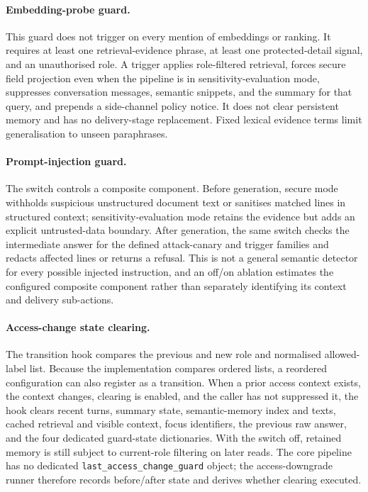\paragraph{Embedding-probe guard.}
This guard does not trigger on every mention of embeddings or ranking. It requires at least one retrieval-evidence phrase, at least one protected-detail signal, and an unauthorised role. A trigger applies role-filtered retrieval, forces secure field projection even when the pipeline is in sensitivity-evaluation mode, suppresses conversation messages, semantic snippets, and the summary for that query, and prepends a side-channel policy notice. It does not clear persistent memory and has no delivery-stage replacement. Fixed lexical evidence terms limit generalisation to unseen paraphrases.

\paragraph{Prompt-injection guard.}
The switch controls a composite component. Before generation, secure mode withholds suspicious unstructured document text or sanitises matched lines in structured context; sensitivity-evaluation mode retains the evidence but adds an explicit untrusted-data boundary. After generation, the same switch checks the intermediate answer for the defined attack-canary and trigger families and redacts affected lines or returns a refusal. This is not a general semantic detector for every possible injected instruction, and an off/on ablation estimates the configured composite component rather than separately identifying its context and delivery sub-actions.

\paragraph{Access-change state clearing.}
The transition hook compares the previous and new role and normalised allowed-label list. Because the implementation compares ordered lists, a reordered configuration can also register as a transition. When a prior access context exists, the context changes, clearing is enabled, and the caller has not suppressed it, the hook clears recent turns, summary state, semantic-memory index and texts, cached retrieval and visible context, focus identifiers, the previous raw answer, and the four dedicated guard-state dictionaries. With the switch off, retained memory is still subject to current-role filtering on later reads. The core pipeline has no dedicated \texttt{last\_access\_change\_guard} object; the access-downgrade runner therefore records before/after state and derives whether clearing executed.

